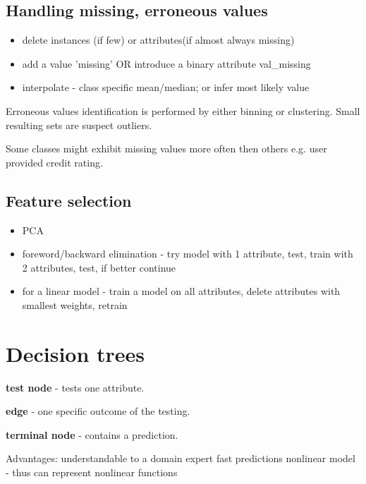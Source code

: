 \documentclass{article}
\newcommand{\para}[0]{\par\vspace{0.2cm}\noindent}
\newcommand{\define}[2]{\textbf{#1} - {#2}.  \para}
\begin{document}
\subsection{Handling missing, erroneous values}
\begin{itemize}
    \item{delete instances (if few) or attributes(if almost always missing)}
    \item{add a value 'missing' OR introduce a binary attribute val\_missing}
    \item{interpolate - class specific mean/median; or infer most likely value}
\end{itemize}
\para
Erroneous values identification is performed by either binning or clustering.
Small resulting sets are suspect outliers.
\par
Some classes might exhibit missing values more often then others e.g. user provided credit rating.


\subsection{Feature selection}
\begin{itemize}
    \item{PCA}
    \item{foreword/backward elimination - try model with 1 attribute, test, train with 2 attributes, test, if better continue}
    \item{for a linear model - train a model on all attributes, delete attributes with smallest weights, retrain}
\end{itemize}


\section{Decision trees}
\define{test node}
           {tests one attribute}
\define{edge}
           {one specific outcome of the testing}
\define{terminal node}
           {contains a prediction}

Advantages:
    understandable to a domain expert
    fast predictions
    nonlinear model - thus can represent nonlinear functions
\end{document}
